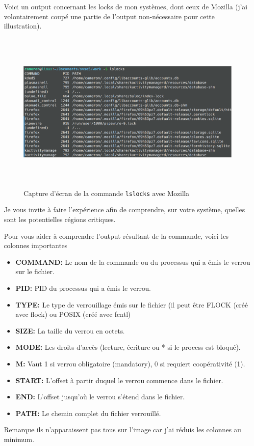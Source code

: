 Voici un output concernant les locks de mon systèmes, dont ceux de Mozilla (j'ai volontairement coupé une partie de l'output non-nécessaire pour cette illustration).
\begin{figure}[ht]
  \centering
  \includegraphics[width=1.0\textwidth, height=8cm]{img/lslock-output.png}
    \caption{Capture d'écran de la commande \texttt{lslocks} avec Mozilla}
    \label{fig:lslocks-mozilla}
\end{figure}
\newline
Je vous invite à faire l'expérience afin de comprendre, sur votre système, quelles sont les potentielles régions critiques.

Pour vous aider à comprendre l'output résultant de la commande, voici les colonnes importantes\cite{ManLslock}
\begin{itemize}
    \item \textbf{COMMAND:} Le nom de la commande ou du processus qui a émis le verrou sur le fichier.
    \item \textbf{PID:} PID du processus qui a émis le verrou.
    \item \textbf{TYPE:} Le type de verrouillage émis sur le fichier (il peut être FLOCK (créé avec flock)  ou  POSIX  (créé  avec fcntl)
    \item \textbf{SIZE:} La taille du verrou en octets.
    \item \textbf{MODE:} Les droits d'accès (lecture, écriture ou * si le process est bloqué).
    \item \textbf{M:} Vaut 1 si verrou obligatoire (mandatory), 0 si requiert coopérativité (1).
    \item \textbf{START:} L'offset à partir duquel le verrou commence dans le fichier.
    \item \textbf{END:} L'offset jusqu'où le verrou s'étend dans le fichier.
    \item \textbf{PATH:} Le chemin complet du fichier verrouillé.
\end{itemize}

Remarque ils n'apparaissent pas tous sur l'image car j'ai réduis les colonnes au minimum. 

